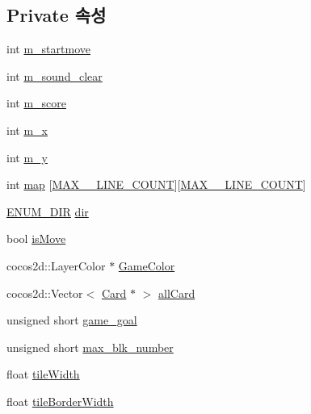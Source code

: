 \subsection*{Private 속성}
\begin{DoxyCompactItemize}
\item 
int \hyperlink{class_code_lady_j_j_y_1_1game2048_1_1_game_scene_a199eba778f36532a166124213aaea11f}{m\+\_\+startmove}
\item 
int \hyperlink{class_code_lady_j_j_y_1_1game2048_1_1_game_scene_a736ba67f3d81332ca29f2d49fbdbcce3}{m\+\_\+sound\+\_\+clear}
\item 
int \hyperlink{class_code_lady_j_j_y_1_1game2048_1_1_game_scene_abaa6efe9f6fe529d3ed404bc95ba14c4}{m\+\_\+score}
\item 
int \hyperlink{class_code_lady_j_j_y_1_1game2048_1_1_game_scene_a28a91c0ced0131c08595ebba7459fd98}{m\+\_\+x}
\item 
int \hyperlink{class_code_lady_j_j_y_1_1game2048_1_1_game_scene_a35a99b7ce5913181113da936ec766897}{m\+\_\+y}
\item 
int \hyperlink{class_code_lady_j_j_y_1_1game2048_1_1_game_scene_a4d8924d645182d1e2f6b44390e4101ea}{map} \mbox{[}\hyperlink{_game_scene_8hpp_ab1b9aa851d1926d0b52bc8fb01ae6707}{M\+A\+X\+\_\+\_\+\+L\+I\+N\+E\+\_\+\+C\+O\+U\+NT}\mbox{]}\mbox{[}\hyperlink{_game_scene_8hpp_ab1b9aa851d1926d0b52bc8fb01ae6707}{M\+A\+X\+\_\+\_\+\+L\+I\+N\+E\+\_\+\+C\+O\+U\+NT}\mbox{]}
\item 
\hyperlink{namespace_code_lady_j_j_y_1_1game2048_a5ce81ccb99ee47dcef151e7f8c9da08f}{E\+N\+U\+M\+\_\+\+D\+IR} \hyperlink{class_code_lady_j_j_y_1_1game2048_1_1_game_scene_a787c38369bdc3a961b877de364d999d4}{dir}
\item 
bool \hyperlink{class_code_lady_j_j_y_1_1game2048_1_1_game_scene_a72716d8ae260804ce013766cf4ad1505}{is\+Move}
\item 
cocos2d\+::\+Layer\+Color $\ast$ \hyperlink{class_code_lady_j_j_y_1_1game2048_1_1_game_scene_a191affcd48b814ad840883e491107a2b}{Game\+Color}
\item 
cocos2d\+::\+Vector$<$ \hyperlink{class_code_lady_j_j_y_1_1game2048_1_1_card}{Card} $\ast$ $>$ \hyperlink{class_code_lady_j_j_y_1_1game2048_1_1_game_scene_aadcd54235c70f1d794213f50f429437f}{all\+Card}
\item 
unsigned short \hyperlink{class_code_lady_j_j_y_1_1game2048_1_1_game_scene_a32978808e5a60713a1d8bf085c2d3e11}{game\+\_\+goal}
\item 
unsigned short \hyperlink{class_code_lady_j_j_y_1_1game2048_1_1_game_scene_a8e51807adfe412a0b206f0d35341851e}{max\+\_\+blk\+\_\+number}
\item 
float \hyperlink{class_code_lady_j_j_y_1_1game2048_1_1_game_scene_ab307f78ad0015cd32b2c71483fcb3cc5}{tile\+Width}
\item 
float \hyperlink{class_code_lady_j_j_y_1_1game2048_1_1_game_scene_a6f0cd9c0147ba3acc5290d443db8d7d8}{tile\+Border\+Width}
\end{DoxyCompactItemize}


